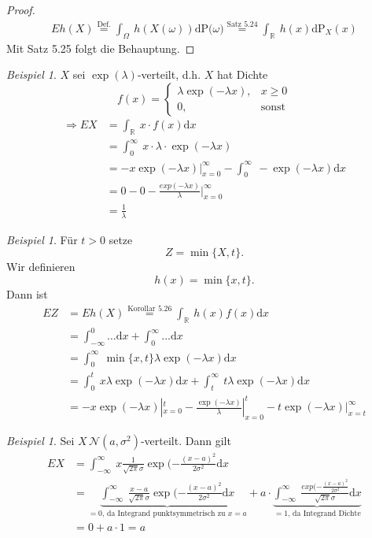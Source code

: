 \documentclass[a4paper,12pt,fleqn]{scrartcl}
\newcommand{\R}{\mathbb{R}}
\newcommand{\m}[1]{\mathcal{ #1 }}
\newcommand{\p}[1]{\text{P(} #1 \text{)}}
\newcommand{\impl}{\Rightarrow}
\theoremstyle{definition}
\theoremstyle{plain}
\theoremstyle{remark}
\newtheorem{beispiel}[definition]{Beispiel}
\newtheorem*{beispiel*}{Beispiel}
\begin{document}
\begin{proof}
\begin{align*}
Eh(X) \overset{\text{Def.}}{=} \int_{\Omega}\: h(X(\omega))\mathrm{d}\p{\omega} \overset{\text{Satz 5.24}}{=} \int_{\R}\: h(x)\mathrm{d}\text{P}_X(x)
\end{align*}
Mit Satz 5.25 folgt die Behauptung.
\end{proof}
\begin{beispiel}
$X$ sei $\exp(\lambda)$-verteilt, d.h. $X$ hat Dichte
\[f(x)=\begin{cases}\lambda\exp(-\lambda x),&x\geq 0\\
0,&\text{sonst}
\end{cases}\]
\begin{align*}
\impl EX&=\int_{\R}\: x\cdot f(x)\mathrm{d}x\\
&=\int_0^{\infty}\: x\cdot\lambda\cdot\exp(-\lambda x)\\
&=-x\exp(-\lambda x)|_{x=0}^{\infty}-\int_0^{\infty}\:-\exp(-\lambda x)\mathrm{d}x\\
&=0-0-\frac{exp(-\lambda x)}{\lambda}|_{x=0}^{\infty}\\
&=\frac{1}{\lambda}
\end{align*}
\end{beispiel}
\begin{beispiel*}
Für $t>0$ setze
\[Z=\min\{ X,t\}.\]
Wir definieren
\[h(x)=\min\{ x,t\}.\]
Dann ist
\begin{align*}
EZ&=Eh(X)\overset{\text{Korollar 5.26}}{=}\int_{\R}\: h(x)f(x)\mathrm{d}x\\
&=\int_{-\infty}^0\ldots\mathrm{d}x+\int_0^{\infty}\ldots\mathrm{d}x\\
&=\int_0^{\infty}\:\min\{ x,t\}\lambda\exp(-\lambda x)\mathrm{d} x\\
&=\int_0^t\: x\lambda\exp(-\lambda x)\mathrm{d}x+\int_t^{\infty}\: t\lambda\exp(-\lambda x)\mathrm{d}x\\
&=-x\exp(-\lambda x)|_{x=0}^t-\frac{\exp(-\lambda x)}{\lambda}|_{x=0}^t-t\exp(-\lambda x)|_{x=t}^{\infty}
\end{align*}
\end{beispiel*}
\begin{beispiel}
Sei $X \, \m{N}(a,\sigma^2)$-verteilt. Dann gilt
\begin{align*}
EX&=\int_{-\infty}^{\infty}\: x\frac{1}{\sqrt{2\pi}\sigma}\exp(-\frac{(x-a)^2}{2\sigma^2}\mathrm{d}x\\
&=\underbrace{\int_{-\infty}^{\infty}\: \frac{x-a}{\sqrt{2\pi}\sigma}\exp(-\frac{(x-a)^2}{2\sigma^2}\mathrm{d}x}_{=0\text{, da Integrand punktsymmetrisch zu }x=a}+a\cdot\underbrace{\int_{-\infty}^{\infty}\: \frac{exp(-\frac{(x-a)^2}{2\sigma^2}}{\sqrt{2\pi}\sigma}\mathrm{d}x}_{=1\text{, da Integrand Dichte}}\\
&=0+a\cdot 1=a
\end{align*}
\end{beispiel}
\end{document}
